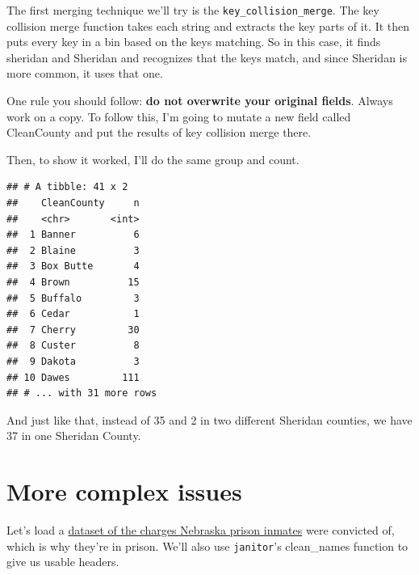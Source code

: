 \documentclass[]{book}
\newenvironment{Shaded}{\begin{snugshade}}{\end{snugshade}}
\newcommand{\DataTypeTok}[1]{\textcolor[rgb]{0.13,0.29,0.53}{#1}}
\newcommand{\KeywordTok}[1]{\textcolor[rgb]{0.13,0.29,0.53}{\textbf{#1}}}
\newcommand{\NormalTok}[1]{#1}
\newcommand{\OperatorTok}[1]{\textcolor[rgb]{0.81,0.36,0.00}{\textbf{#1}}}
\newcommand{\StringTok}[1]{\textcolor[rgb]{0.31,0.60,0.02}{#1}}
\begin{document}
The first merging technique we'll try is the \texttt{key\_collision\_merge}. The key collision merge function takes each string and extracts the key parts of it. It then puts every key in a bin based on the keys matching. So in this case, it finds sheridan and Sheridan and recognizes that the keys match, and since Sheridan is more common, it uses that one.

One rule you should follow: \textbf{do not overwrite your original fields}. Always work on a copy. To follow this, I'm going to mutate a new field called CleanCounty and put the results of key collision merge there.

Then, to show it worked, I'll do the same group and count.

\begin{Shaded}
\end{Shaded}

\begin{verbatim}
## # A tibble: 41 x 2
##    CleanCounty     n
##    <chr>       <int>
##  1 Banner          6
##  2 Blaine          3
##  3 Box Butte       4
##  4 Brown          15
##  5 Buffalo         3
##  6 Cedar           1
##  7 Cherry         30
##  8 Custer          8
##  9 Dakota          3
## 10 Dawes         111
## # ... with 31 more rows
\end{verbatim}

And just like that, instead of 35 and 2 in two different Sheridan counties, we have 37 in one Sheridan County.

\hypertarget{more-complex-issues}{%
\section{More complex issues}\label{more-complex-issues}}

Let's load a \href{https://unl.box.com/s/7vs5ycscmzg3bnxhxqdv7aegill2gz2z}{dataset of the charges Nebraska prison inmates} were convicted of, which is why they're in prison. We'll also use \texttt{janitor}'s clean\_names function to give us usable headers.

\begin{Shaded}
\end{Shaded}
\end{document}
